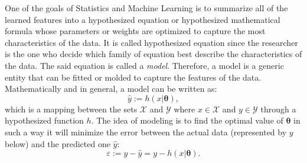 One of the goals of Statistics and Machine Learning is to summarize all of the learned features into a hypothesized equation or hypothesized mathematical formula whose parameters or weights are optimized to capture the most characteristics of the data. It is called hypothesized equation since the researcher is the one who decide which family of equation best describe the characteristics of the data. The said equation is called a \textit{model}. Therefore, a model is a generic entity that can be fitted or molded to capture the features of the data. Mathematically and in general, a model can be written as:
\begin{equation}\label{eq:general_model}
    \hat{y}:=h(x|\mathbf{\theta}),
\end{equation}
which is a mapping between the sets $\mathcal{X}$ and $\mathcal{Y}$ where $x\in\mathcal{X}$ and $y\in\mathcal{Y}$ through a hypothesized function $h$. The idea of modeling is to find the optimal value of $\mathbf{\theta}$ in such a way it will minimize the error between the actual data (represented by $y$ below) and the predicted one $\hat{y}$:
\begin{equation}
    \varepsilon:=y-\hat{y}=y-h(x|\mathbf{\theta}).
\end{equation}

